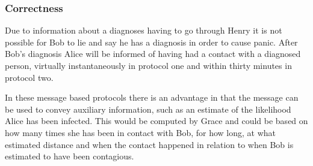 \documentclass{article}
\begin{document}
\subsubsection{Correctness}

Due to information about a diagnoses having to go through Henry it is not possible for Bob to lie and say he has a diagnosis in order to cause panic. After Bob's diagnosis Alice will be informed of having had a contact with a diagnosed person, virtually instantaneously in protocol one and within thirty minutes in protocol two.

In these message based protocols there is an advantage in that the message can be used to convey auxiliary information, such as an estimate of the likelihood Alice has been infected. This would be computed by Grace and could be based on how many times she has been in contact with Bob, for how long, at what estimated distance and when the contact happened in relation to when Bob is estimated to have been contagious. 






\end{document}

